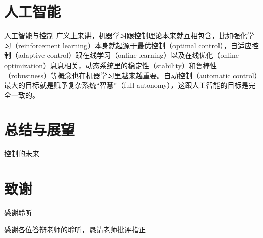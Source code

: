 \documentclass[10pt]{ctexbeamer}
\begin{document}
\section{人工智能}

\begin{frame}{人工智能与控制}
  广义上来讲，机器学习跟控制理论本来就互相包含，比如强化学习（reinforcement learning）本身就起源于最优控制（optimal control），自适应控制（adaptive control）跟在线学习（online learning）以及在线优化（online optimization）息息相关，动态系统里的稳定性（stability）和鲁棒性（robustness）等概念也在机器学习里越来越重要。自动控制（automatic control）最大的目标就是赋予复杂系统“智慧”（full autonomy），这跟人工智能的目标是完全一致的。
\end{frame}

\section{总结与展望}
    \begin{frame}{控制的未来}
    \end{frame}



\section*{致谢}  
  \begin{frame}
  \textcolor{rstd}{\Huge{\centerline{感谢聆听}}}
  \vspace{8pt}
  
  \textcolor{rgreen}{\songti\centerline{感谢各位答辩老师的聆听，恳请老师批评指正}}
  \end{frame}
\end{document}
